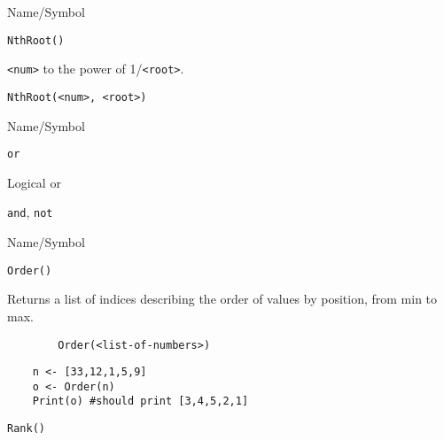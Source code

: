 \begin{desc}{Name/Symbol}
\item[Name/Symbol]	\verb+NthRoot()+

\item[Description]	\verb+<num>+ to the power of  1/\verb+<root>+.

\item[Usage]		
\begin{verbatim}
NthRoot(<num>, <root>)
\end{verbatim}

\item[Example]	

\item[See Also]	
\end{desc}

\vfill
\newpage
{}
\vfill


\begin{desc}{Name/Symbol}
\item[Name/Symbol]	\verb+or+                   

\item[Description]	Logical or

\item[Usage]		

\item[Example]	

\item[See Also]	\verb+and+, \verb+not+
\end{desc}





\begin{desc}{Name/Symbol}
\item[Name/Symbol]	\verb+Order()+

\item[Description]	Returns a list of indices describing the order of values by position, from min to max. 

\item[Usage]
\begin{verbatim}
		Order(<list-of-numbers>)
\end{verbatim}

\item[Example]	
\begin{verbatim}
	n <- [33,12,1,5,9]
  	o <- Order(n)
    Print(o) #should print [3,4,5,2,1]
\end{verbatim}

\item[See Also]	\verb+Rank()+
\end{desc}

